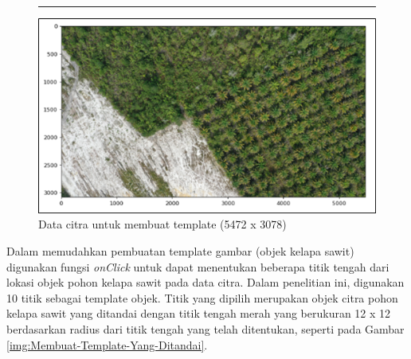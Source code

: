 \begin{figure}[H]
	\vspace{-0.1cm}
	\rule{\columnwidth}{0.1pt}
	\begin{center}
		\includegraphics[width=1\columnwidth]{bab4/Gambar/Picture11.png}
	\end{center}
	\vspace{-0.2cm}
	\captionsetup{justification=centering}
	\caption{Data citra untuk membuat template (5472 x 3078)}\label{img:Data-Citra-Untuk-Membuat-Template}
\end{figure}

Dalam memudahkan pembuatan template gambar (objek kelapa sawit) digunakan fungsi \textit{onClick} untuk dapat menentukan beberapa titik tengah dari lokasi objek pohon kelapa sawit pada data citra. Dalam penelitian ini, digunakan 10 titik sebagai template objek. Titik yang dipilih merupakan objek citra pohon kelapa sawit yang ditandai dengan titik tengah merah yang berukuran 12 x 12 berdasarkan radius dari titik tengah yang telah ditentukan, seperti pada Gambar \ref{img:Membuat-Template-Yang-Ditandai}.

